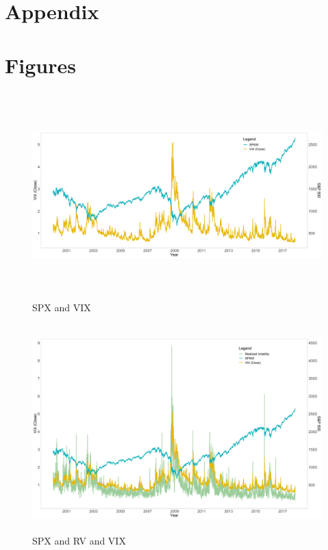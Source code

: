 \section{Appendix}
\appendix
\section*{Figures}
%
\begin{figure}[!htbp]\caption{\ac{SPX} and VIX}\label{fig:SPandVIX}
\includegraphics[width=16cm, height=8cm]{pictures/SPandViX.png}
\end{figure}
%
\begin{figure}[!htbp]\caption{\ac{SPX} and RV and VIX}\label{fig:SPandVIXandVol}
\includegraphics[width=16cm, height=8cm]{pictures/SPandVolandViX.png}
\end{figure}

\newpage
